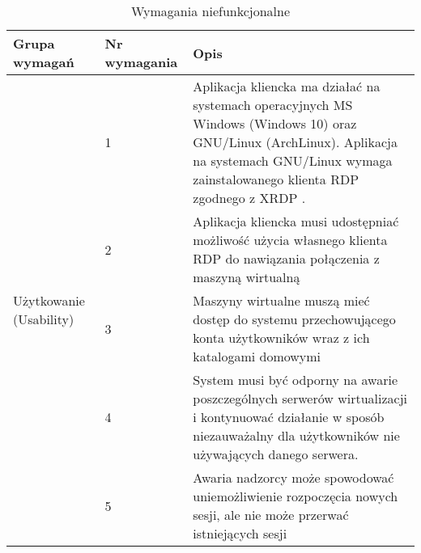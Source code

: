 \documentclass[../wstep.tex]{subfiles}
\begin{document}
\label{requirements:nonfunctional}

\begin{table}[H]
    \caption[Opis skrócony]{Wymagania niefunkcjonalne}
    \label{non-functional}
    \centering
    \begin{tabular}{|p{}|p{}|p{}|}
        \hline Grupa wymagań                            & Nr wymagania & Opis                                                                                                                                                                                                                                                                                                                  \\ \hline
        \multirow[t]{8}{=}{Użytkowanie (Usability)}     & 1            & Aplikacja kliencka ma działać na systemach operacyjnych MS Windows (Windows 10) oraz GNU/Linux (ArchLinux). Aplikacja na systemach GNU/Linux wymaga zainstalowanego klienta RDP zgodnego z XRDP \parencite{xrdp-clients}. \\ \cline{2-3}
                                                        & 2            & Aplikacja kliencka musi udostępniać możliwość użycia własnego klienta RDP do nawiązania połączenia z maszyną wirtualną                                                                                                                                                                                                \\ \cline{2-3}
                                                        & 3            & Maszyny wirtualne muszą mieć dostęp do systemu przechowującego konta użytkowników wraz z ich katalogami domowymi                                                                                                                                                                                                      \\ \hline
        \multirow[t]{7}{=}{Niezawodność (Reliability)}  & 4            & System musi być odporny na awarie poszczególnych serwerów wirtualizacji i kontynuować działanie w sposób niezauważalny dla użytkowników nie używających danego serwera.                                                                                                                                               \\ \cline{2-3}
                                                        & 5            & Awaria nadzorcy może spowodować uniemożliwienie rozpoczęcia nowych sesji, ale nie może przerwać istniejących sesji                                                                                                                                                                                                    \\ \hline

\end{tabular}
\end{table}
\end{document}
